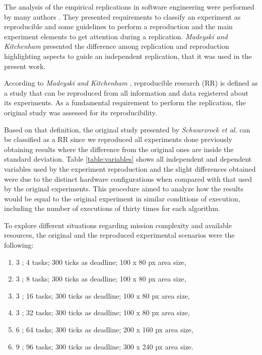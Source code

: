The analysis of the empirical replications in software engineering were performed by many authors \cite{exp05, exp04, exp03, exp01}. They presented requirements to classify an experiment as reproducible and some guidelines to perform a reproduction and the main experiment elements to get attention during a replication. \textit{Madeyski and Kitchenham} \cite{exp02} presented the difference among replication and reproduction highlighting aspects to guide an independent replication, that it was used in the present work.

According to \textit{Madeyski and Kitchenham} \cite{exp02}, reproducible research (RR) is defined as a study that can be reproduced from all information and data registered about its experiments. As a fundamental requirement to perform the replication, the original study was assessed for its reproducibility.

Based on that definition, the original study presented by \textit{Schwarzrock et al.} \cite{MAS07} can be classified as a RR since we reproduced all experiments done previously obtaining results where the difference from the original ones are inside the standard deviation. Table \ref{table:variables} shows all independent and dependent variables used by the experiment reproduction and the slight differences obtained were due to the distinct hardware configurations when compared with that used by the original experiments. This procedure aimed to analyze how the results would be equal to the original experiment in similar conditions of execution, including the number of executions of thirty times for each algorithm.

To explore different situations regarding mission complexity and available resources, the original and the reproduced experimental scenarios were the following:

\begin{enumerate}
	\item 3 \uavs; 4 tasks; 300 ticks as deadline; 100 x 80 px area size, \label{case:4tasks}
	\item 3 \uavs; 8 tasks; 300 ticks as deadline; 100 x 80 px area size, \label{case:8tasks}
	\item 3 \uavs; 16 tasks; 300 ticks as deadline; 100 x 80 px area size, \label{case:16tasks}
	\item 3 \uavs; 32 tasks; 300 ticks as deadline; 100 x 80 px area size, \label{case:32tasks}
	\item 6 \uavs; 64 tasks; 300 ticks as deadline; 200 x 160 px area size, \label{case:64tasks}
	\item 9 \uavs; 96 tasks; 300 ticks as deadline; 300 x 240 px area size. \label{case:96tasks}
\end{enumerate}


